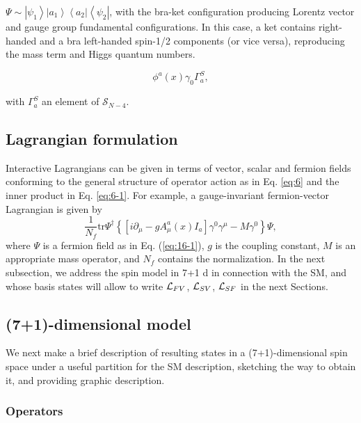 \documentclass[12pt]{article}
\renewcommand\[{\begin{dmath}}
\renewcommand\]{\end{dmath}}
\begin{document}
$\Psi\sim\left|\psi_1\right\rangle\left|a_1\right\rangle\left\langle a_2\right|\left\langle \psi_2\right|$, with the bra-ket configuration producing Lorentz  vector and gauge group fundamental   configurations. In this case, a ket contains right-handed and a bra left-handed  spin-1/2 components (or vice versa),  reproducing the mass term and Higgs quantum numbers.

\begin{equation}
\phi^{a}(x)\gamma_{0}\Gamma_{a}^{S},\label{eq:15-1}
\end{equation}

\noindent with $\Gamma_{a}^{S}$ an element of $\mathcal{S}_{N-4}$.



\subsection{Lagrangian formulation}


Interactive Lagrangians\cite{BesproRicardo} can be given in
terms of vector, scalar and fermion fields conforming to the general
structure of   operator action as in Eq.  \ref{eq:6} and the inner product in Eq. \ref{eq:6-1}.
\noindent For example, a gauge-invariant fermion-vector Lagrangian
is given by
\begin{equation}
\dfrac{1}{N_{f}}\text{tr}\Psi^{\dagger}\left\{ \left[i\partial_{\mu}-gA_{\mu}^{a}(x)I_{a}\right]\gamma^{0}\gamma^{\mu}-M\gamma^{0}\right\} \Psi,\label{eq:18-1}
\end{equation}
\noindent where $\Psi$ is a fermion field as in Eq. (\ref{eq:16-1}), $g$ is the coupling constant, $M$ is an appropriate mass operator, and $N_{f}$ contains the normalization. In the next subsection, we address    the spin model  in 7+1  d   in connection with the SM, and whose basis states will allow
to write ${\cal L}_{FV}$, ${\cal L}_{SV}$,  $ {\cal L}_{SF}$ in the next Sections.


\subsection{(7+1)-dimensional model}


We next make a brief description of resulting states in a (7+1)-dimensional
spin space under a useful partition for the SM description,
 sketching  the way to obtain it, and providing   graphic description.



\subsubsection{Operators}
\end{document}
